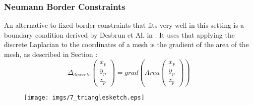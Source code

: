 \subsubsection{Neumann Border Constraints}
An alternative to fixed border constraints that fits very well in this setting is a boundary condition derived by Desbrun et Al. in \cite{meshpar1}. It uses that applying the discrete Laplacian to the coordinates of a mesh is the gradient of the area of the mesh, as described in Section \note{[...]}:
\[\Delta_{discrete}\begin{pmatrix}x_p\\y_p\\z_p\end{pmatrix} = grad(Area\begin{pmatrix}x_p\\y_p\\z_p\end{pmatrix})\]

\begin{figure}%
\begin{center}
\texttt{[image: imgs/7\_trianglesketch.eps]}%
\end{center}
\caption{}%
\label{fig:7_neumansketch}%
\end{figure}


